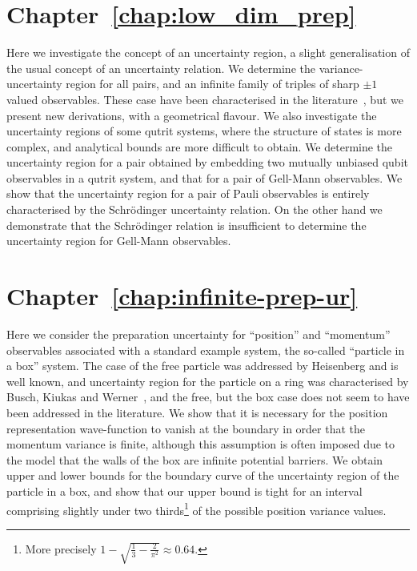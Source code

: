 \section*{Chapter~\ref{chap:low_dim_prep}}

Here we investigate the concept of an uncertainty region, a slight generalisation of the usual concept of an uncertainty relation. We determine the variance-uncertainty region for all pairs, and an infinite family of triples of sharp $\pm 1$ valued observables. These case have been characterised in the literature~\cites{LiQiao2015}{AbbottAlzieuHallBranciard2016}, but we present new derivations, with a geometrical flavour. We also investigate the uncertainty regions of some qutrit systems, where the structure of states is more complex, and analytical bounds are more difficult to obtain. We determine the uncertainty region for a pair obtained by embedding two mutually unbiased qubit observables in a qutrit system, and that for a pair of Gell-Mann observables. We show that the uncertainty region for a pair of Pauli observables is entirely characterised by the Schr{\"o}dinger uncertainty relation. On the other hand we demonstrate that the Schr{\"o}dinger relation is insufficient to determine the uncertainty region for Gell-Mann observables.

\section*{Chapter~\ref{chap:infinite-prep-ur}}

Here we consider the preparation uncertainty for ``position'' and ``momentum'' observables associated with a standard example system, the so-called ``particle in a box'' system. The case of the free particle was addressed by Heisenberg and is well known, and uncertainty region for the particle on a ring was characterised by Busch, Kiukas and Werner~\cite{sharp-ur-num-angle}, and the free, but the box case does not seem to have been addressed in the literature. We show that it is necessary for the position representation wave-function to vanish at the boundary in order that the momentum variance is finite, although this assumption is often imposed due to the model that the walls of the box are infinite potential barriers. We obtain upper and lower bounds for the boundary curve of the uncertainty region of the particle in a box, and show that our upper bound is tight for an interval comprising slightly under two thirds\footnote{More precisely $1 - \sqrt{\frac{1}{3} - \frac{2}{\pi^2}} \approx 0.64$.} of the possible position variance values. 

